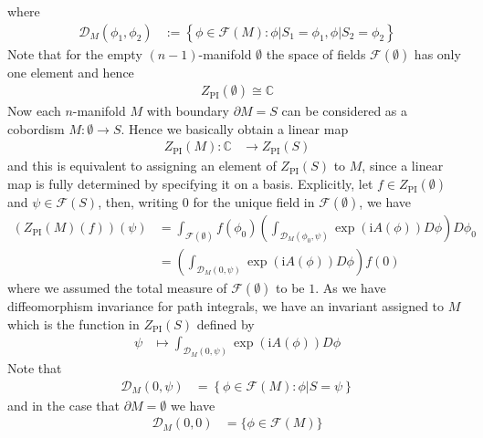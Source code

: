 where
\begin{align*}
  \mathcal{D}_{M}(\phi_{1},\phi_{2})
  &:=
  \left\lbrace
    \phi
    \in
    \mathcal{F}(M)
    \colon
    \phi
    \vert
    S_{1}
    =
    \phi_{1}
    ,
    \phi
    \vert
    S_{2}
    =
    \phi_{2}
  \right\rbrace
\end{align*}
Note that for the empty $(n-1)$-manifold $\emptyset$ the space of fields $\mathcal{F}(\emptyset)$ has only one element and hence
\begin{align*}
  Z_{\mathrm{PI}}(\emptyset)
  \cong
  \mathbb{C}
\end{align*}
Now each $n$-manifold $M$ with boundary $\partial M = S$ can be considered as a cobordism $M \colon \emptyset \to S$. Hence we basically obtain a linear map
\begin{align*}
  Z_{\mathrm{PI}}(M)
  \colon
  \mathbb{C}
  &\to
  Z_{\mathrm{PI}}(S)
\end{align*}
and this is equivalent to assigning an element of $Z_{\mathrm{PI}}(S)$ to $M$, since a linear map is fully determined by specifying it on a basis. Explicitly, let $f \in Z_{\mathrm{PI}}(\emptyset)$ and $\psi \in \mathcal{F}(S)$, then, writing $0$ for the unique field in $\mathcal{F}(\emptyset)$, we have
\begin{align*}
  \left(
    Z_{\mathrm{PI}}(M)(f)
  \right)
  (\psi)
  &=
  \int_{\mathcal{F}(\emptyset)}
  f(\phi_{0})
  \left(
    \int_{\mathcal{D}_{M}(\phi_{0},\psi)}
    \exp(\mathrm{i}A(\phi))
    D\phi
  \right)
  D\phi_{0}
  \\
  &=
  \left(
    \int_{\mathcal{D}_{M}(0,\psi)}
    \exp(\mathrm{i}A(\phi))
    D\phi
  \right)
  f(0)
\end{align*}
where we assumed the total measure of $\mathcal{F}(\emptyset)$ to be $1$. As we have diffeomorphism invariance for path integrals, we have an invariant assigned to $M$ which is the function in $Z_{\mathrm{PI}}(S)$ defined by
\begin{align*}
  \psi
  &\mapsto
  \int_{\mathcal{D}_{M}(0,\psi)}
  \exp(\mathrm{i}A(\phi))
  D\phi
\end{align*}
Note that
\begin{align*}
  \mathcal{D}_{M}(0,\psi)
  &=
  \left\lbrace
    \phi
    \in
    \mathcal{F}(M)
    \colon
    \phi
    \vert
    S
    =
    \psi
  \right\rbrace
\end{align*}
and in the case that $\partial M = \emptyset$ we have
\begin{align*}
  \mathcal{D}_{M}(0,0)
  &=
  \lbrace
    \phi
    \in
    \mathcal{F}(M)
  \rbrace
\end{align*}
